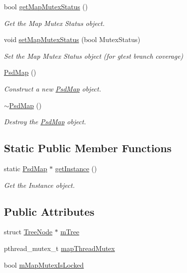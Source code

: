 \begin{DoxyCompactItemize}
bool \hyperlink{class_psd_map_a411472433a3037b0245e9c9f699672b4}{get\+Map\+Mutex\+Status} ()
\begin{DoxyCompactList}\small\item\em Get the Map Mutex Status object. \end{DoxyCompactList}\item 
void \hyperlink{class_psd_map_ac9eeeec55caef16f27da6bd14da5f3a4}{set\+Map\+Mutex\+Status} (bool Mutex\+Status)
\begin{DoxyCompactList}\small\item\em Set the Map Mutex Status object (for gtest branch coverage) \end{DoxyCompactList}\item 
\hyperlink{class_psd_map_a0f0d7e4f35c32b85cc855b375bfdf6f1}{Psd\+Map} ()
\begin{DoxyCompactList}\small\item\em Construct a new \hyperlink{class_psd_map}{Psd\+Map} object. \end{DoxyCompactList}\item 
\hyperlink{class_psd_map_a027edc72c34c1d7845385bb57bff0956}{$\sim$\+Psd\+Map} ()
\begin{DoxyCompactList}\small\item\em Destroy the \hyperlink{class_psd_map}{Psd\+Map} object. \end{DoxyCompactList}\end{DoxyCompactItemize}
\subsection*{Static Public Member Functions}
\begin{DoxyCompactItemize}
\item 
static \hyperlink{class_psd_map}{Psd\+Map} $\ast$ \hyperlink{class_psd_map_a559bfdc80678bf39ebcf0d351d002838}{get\+Instance} ()
\begin{DoxyCompactList}\small\item\em Get the Instance object. \end{DoxyCompactList}\end{DoxyCompactItemize}
\subsection*{Public Attributes}
\begin{DoxyCompactItemize}
\item 
struct \hyperlink{struct_tree_node}{Tree\+Node} $\ast$ \hyperlink{class_psd_map_a906a31bbf47593efd39648627ec84d04}{m\+Tree}
\item 
pthread\+\_\+mutex\+\_\+t \hyperlink{class_psd_map_a8fbc224227e28dec675589a701b9d8ad}{map\+Thread\+Mutex}
\item 
bool \hyperlink{class_psd_map_affea202c3988b6f45fe19c8669121816}{m\+Map\+Mutex\+Is\+Locked}
\end{DoxyCompactItemize}
